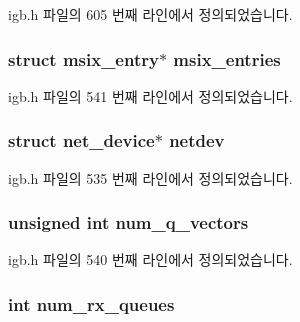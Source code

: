 igb.\+h 파일의 605 번째 라인에서 정의되었습니다.

\subsubsection[{\texorpdfstring{msix\+\_\+entries}{msix_entries}}]{\setlength{\rightskip}{0pt plus 5cm}struct msix\+\_\+entry$\ast$ msix\+\_\+entries}\hypertarget{structigb__adapter_abfef94b7ce9785066c5cdc6c4afbf045}{}\label{structigb__adapter_abfef94b7ce9785066c5cdc6c4afbf045}


igb.\+h 파일의 541 번째 라인에서 정의되었습니다.

\subsubsection[{\texorpdfstring{netdev}{netdev}}]{\setlength{\rightskip}{0pt plus 5cm}struct net\+\_\+device$\ast$ netdev}\hypertarget{structigb__adapter_a5b3eca5b24cb88421c27369d02ebe884}{}\label{structigb__adapter_a5b3eca5b24cb88421c27369d02ebe884}


igb.\+h 파일의 535 번째 라인에서 정의되었습니다.

\subsubsection[{\texorpdfstring{num\+\_\+q\+\_\+vectors}{num_q_vectors}}]{\setlength{\rightskip}{0pt plus 5cm}unsigned int num\+\_\+q\+\_\+vectors}\hypertarget{structigb__adapter_a08d3d8f70cc7a1c49d1fe95041877238}{}\label{structigb__adapter_a08d3d8f70cc7a1c49d1fe95041877238}


igb.\+h 파일의 540 번째 라인에서 정의되었습니다.

\subsubsection[{\texorpdfstring{num\+\_\+rx\+\_\+queues}{num_rx_queues}}]{\setlength{\rightskip}{0pt plus 5cm}int num\+\_\+rx\+\_\+queues}\hypertarget{structigb__adapter_a8f87d5fa7b4dc32f72e10934549f161f}{}\label{structigb__adapter_a8f87d5fa7b4dc32f72e10934549f161f}


